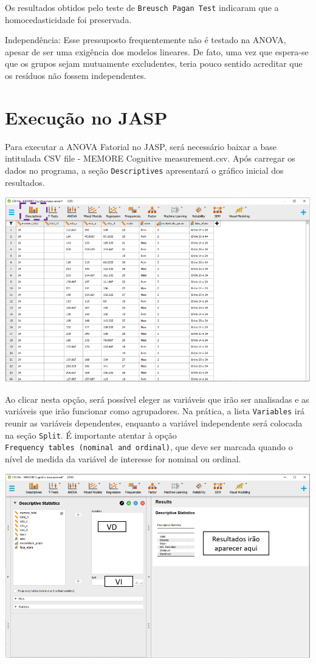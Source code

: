 \documentclass[
]{book}
\begin{document}
Os resultados obtidos pelo teste de \texttt{Breusch\ Pagan\ Test} indicaram que a homocedasticidade foi preservada.

Independência: Esse pressuposto frequentemente não é testado na ANOVA, apesar de ser uma exigência dos modelos lineares. De fato, uma vez que espera-se que os grupos sejam mutuamente excludentes, teria pouco sentido acreditar que os resíduos não fossem independentes.

\hypertarget{execuuxe7uxe3o-no-jasp-10}{%
\section{Execução no JASP}\label{execuuxe7uxe3o-no-jasp-10}}

Para executar a ANOVA Fatorial no JASP, será necessário baixar a base intitulada CSV file - MEMORE Cognitive measurement.csv. Após carregar os dados no programa, a seção \texttt{Descriptives} apresentará o gráfico inicial dos resultados.

\includegraphics{./img/cap_anova_two_way_descriptives.png}

Ao clicar nesta opção, será possível eleger as variáveis que irão ser analisadas e as variáveis que irão funcionar como agrupadores. Na prática, a lista \texttt{Variables} irá reunir as variáveis dependentes, enquanto a variável independente será colocada na seção \texttt{Split}. É importante atentar à opção \texttt{Frequency\ tables\ (nominal\ and\ ordinal)}, que deve ser marcada quando o nível de medida da variável de interesse for nominal ou ordinal.

\includegraphics{./img/cap_anova_two_way_descriptives2.png}
\end{document}
